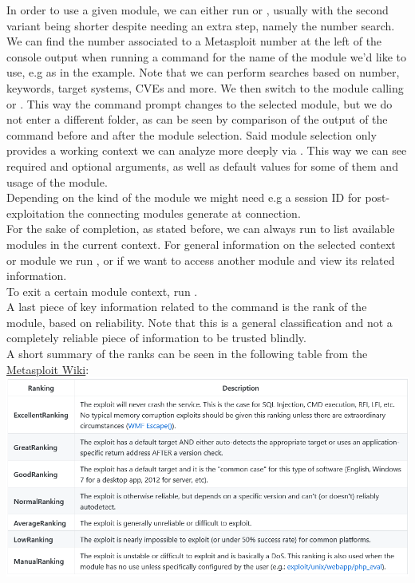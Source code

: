 {In order to use a given module, we can either run  or , usually with the second variant being shorter despite needing an extra step, namely the number search. We can find the number associated to a Metasploit number at the left of the console output when running a  command for the name of the module we'd like to use, e.g  as in the example. Note that we can perform searches based on number, keywords, target systems, CVEs and more. We then switch to the module calling  or . This way the command prompt changes to the selected module, but we do not enter a different folder, as can be seen by comparison of the output of the  command before and after the module selection. Said module selection only provides a working context we can analyze more deeply via . This way we can see required and optional arguments, as well as default values for some of them and usage of the module.\\
Depending on the kind of the module we might need e.g a session ID for post-exploitation the connecting modules generate at connection.\\
For the sake of completion, as stated before, we can always run  to list available modules in the current context. For general information on the selected context or module we run , or  if we want to access another module and view its related information.\\
To exit a certain module context, run .\\
A last piece of key information related to the  command is the rank of the module, based on reliability. Note that this is a general classification and not a completely reliable piece of information to be trusted blindly.\\
A short summary of the ranks can be seen in the following table from the \href{https://github.com/rapid7/metasploit-framework/wiki/Exploit-Ranking}{Metasploit Wiki}:\\
\includegraphics[scale=0.35]{Complete_Beginner_Path/Windows_Exploitation_Basics_Room/Metasploit_Rank_Table.png}\\
}
